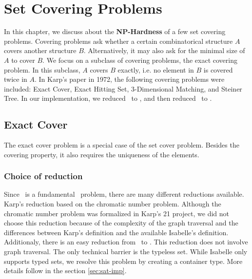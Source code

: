 \chapter{Set Covering Problems}\label{chapter:covering}
In this chapter, we discuss about the \textbf{NP-Hardness} of a few set covering problems. 
Covering problems ask whether a certain combinatorical structure $A$ covers another structure $B$. 
Alternatively, it may also ask for the minimal size of $A$ to cover $B$. 
We focus on a subclass of covering problems, the exact covering problem. In this subclass, 
$A$ covers $B$ exactly, i.e. no element in $B$ is covered twice in $A$. 
In Karp's paper in 1972, the following covering problems were included: Exact Cover, Exact Hitting Set,
3-Dimensional Matching, and Steiner Tree. In our implementation, we reduced \SAT\ to \XC, and then reduced \XC\ to \HS. 

\section{Exact Cover}
The exact cover problem is a special case of the set cover problem. Besides the covering property, it also requires the uniqueness of the elements. 

\subsection{Choice of reduction}
Since \XC\ is a fundamental \NPH\ problem, there are many different reductions available. 
Karp's reduction based on the chromatic number problem. 
Although the chromatic number problem was formalized in Karp's 21 project, we did not choose this reduction
because of the complexity of the graph traversal and the differences between Karp's definition and the available Isabelle's definition. 
Additionaly, there is an easy reduction from \SAT\ to \XC. This reduction does not involve graph traversal.
The only technical barrier is the typeless set. While Isabelle only supports typed sets, we resolve this problem
by creating a container type. More details follow in the section \ref*{sec:sat-imp}. 


